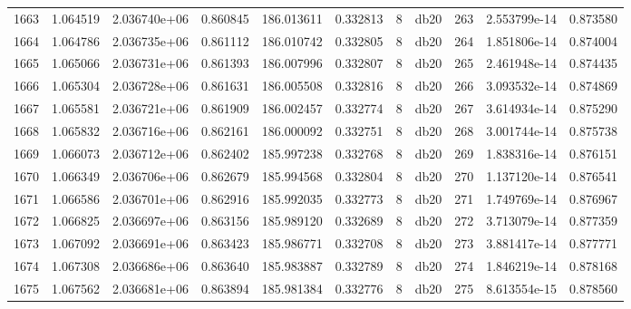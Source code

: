 \begin{tabular}{lrrrrrrlrrr}
1663 &    1.064519 &        2.036740e+06 &  0.860845 &              186.013611 &    0.332813 &       8 &         db20 &    263 &   2.553799e-14 &      0.873580 \\
1664 &    1.064786 &        2.036735e+06 &  0.861112 &              186.010742 &    0.332805 &       8 &         db20 &    264 &   1.851806e-14 &      0.874004 \\
1665 &    1.065066 &        2.036731e+06 &  0.861393 &              186.007996 &    0.332807 &       8 &         db20 &    265 &   2.461948e-14 &      0.874435 \\
1666 &    1.065304 &        2.036728e+06 &  0.861631 &              186.005508 &    0.332816 &       8 &         db20 &    266 &   3.093532e-14 &      0.874869 \\
1667 &    1.065581 &        2.036721e+06 &  0.861909 &              186.002457 &    0.332774 &       8 &         db20 &    267 &   3.614934e-14 &      0.875290 \\
1668 &    1.065832 &        2.036716e+06 &  0.862161 &              186.000092 &    0.332751 &       8 &         db20 &    268 &   3.001744e-14 &      0.875738 \\
1669 &    1.066073 &        2.036712e+06 &  0.862402 &              185.997238 &    0.332768 &       8 &         db20 &    269 &   1.838316e-14 &      0.876151 \\
1670 &    1.066349 &        2.036706e+06 &  0.862679 &              185.994568 &    0.332804 &       8 &         db20 &    270 &   1.137120e-14 &      0.876541 \\
1671 &    1.066586 &        2.036701e+06 &  0.862916 &              185.992035 &    0.332773 &       8 &         db20 &    271 &   1.749769e-14 &      0.876967 \\
1672 &    1.066825 &        2.036697e+06 &  0.863156 &              185.989120 &    0.332689 &       8 &         db20 &    272 &   3.713079e-14 &      0.877359 \\
1673 &    1.067092 &        2.036691e+06 &  0.863423 &              185.986771 &    0.332708 &       8 &         db20 &    273 &   3.881417e-14 &      0.877771 \\
1674 &    1.067308 &        2.036686e+06 &  0.863640 &              185.983887 &    0.332789 &       8 &         db20 &    274 &   1.846219e-14 &      0.878168 \\
1675 &    1.067562 &        2.036681e+06 &  0.863894 &              185.981384 &    0.332776 &       8 &         db20 &    275 &   8.613554e-15 &      0.878560 \\

\end{tabular}
